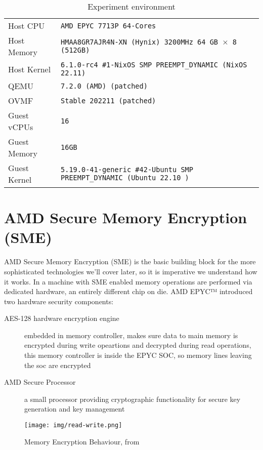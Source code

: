 \documentclass[twocolumn]{article}
\begin{document}
\begin{table*}
    \centering
    \label{tab:experiment-environment}
    \begin{tabular}{l|l   }
        \hline
        Host CPU      & \texttt{AMD EPYC 7713P 64-Cores} \\
        Host Memory   & \texttt{HMAA8GR7AJR4N-XN (Hynix) 3200MHz 64 GB $\times$ 8 (512GB)} \\
        Host Kernel   & \texttt{6.1.0-rc4 \#1-NixOS SMP PREEMPT\_DYNAMIC (NixOS 22.11)} \\
        QEMU          & \texttt{7.2.0 (AMD) (patched)} \\
        OVMF          & \texttt{Stable 202211 (patched)} \\
        Guest vCPUs   & \texttt{16} \\
        Guest Memory  & \texttt{16GB}  \\
        Guest Kernel  & \texttt{5.19.0-41-generic \#42-Ubuntu SMP PREEMPT\_DYNAMIC (Ubuntu 22.10 )} \\ 
        \hline
    \end{tabular}
    \caption{Experiment environment}
\end{table*}

\section{AMD Secure Memory Encryption (SME)}
AMD Secure Memory Encryption (SME) is the basic building block for the more sophisticated technologies we'll cover later, so it is imperative we understand how it works. In a machine with SME enabled memory operations are performed via dedicated hardware, an entirely different chip on die. AMD EPYC™ introduced two hardware security components:
\begin{description}
    \item [AES-128 hardware encryption engine] embedded in memory controller, makes sure data to main memory is encrypted during write opeartions and decrypted during read operations, this memory controller is inside the EPYC SOC, so memory lines leaving the soc are encrypted
    \item [AMD Secure Processor] a small processor providing cryptographic functionality for secure key generation and key management
\end{description}

\begin{figure}
    \centering
    \texttt{[image: img/read-write.png]}
    \caption{Memory Encryption Behaviour, from \cite{memory-encryption}}
\end{figure}
\end{document}
